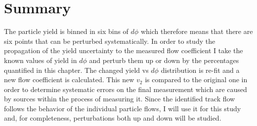 \section{Summary}
The particle yield is binned in six bins of $d\phi$ which therefore means that there are six points that can be perturbed systematically. In order to study the propagation of the yield uncertainty to the measured flow coefficient I take the known values of yield in $d\phi$ and perturb them up or down by the percentages quantified in this chapter. The changed yield vs $d\phi$ distribution is re-fit and a new flow coefficient is calculated. This new $v_2$ is compared to the original one in order to determine systematic errors on the final measurement which are caused by sources within the process of measuring it. Since the identified track flow follows the behavior of the individual particle flows, I will use it for this study and, for completeness, perturbations both up and down will be studied. 



